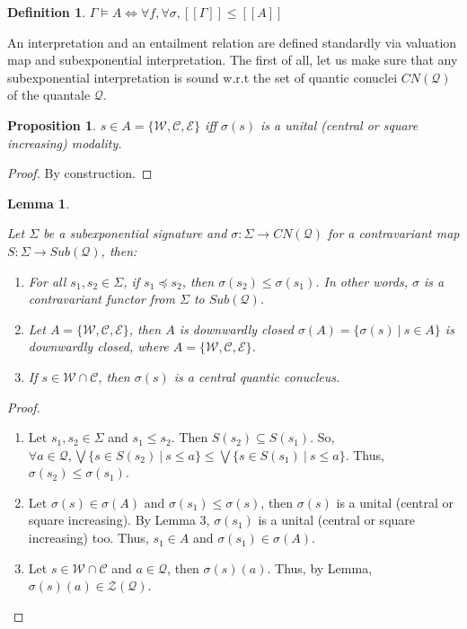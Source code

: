 \documentclass[a4paper]{article}
\theoremstyle{defin}
\newtheorem{defin}{Definition}
\theoremstyle{theorem}
\theoremstyle{prop}
\newtheorem{prop}{Proposition}
\theoremstyle{lemma}
\newtheorem{lemma}{Lemma}
\theoremstyle{ex}
\theoremstyle{col}
\begin{document}
\begin{defin}
  $\Gamma \models A \Leftrightarrow \forall f, \forall \sigma, [\![\Gamma]\!] \leq [\![A]\!]$
\end{defin}

An interpretation and an entailment relation are defined standardly via valuation map and subexponential interpretation.
The first of all, let us make sure that any subexponential interpretation is sound w.r.t the set of quantic conuclei $CN(\mathcal{Q})$ of the quantale $\mathcal{Q}$.

\begin{prop} $s \in A = \{ \mathcal{W}, \mathcal{C}, \mathcal{E} \}$ iff $\sigma(s)$ is a unital (central or square increasing) modality.
\end{prop}

\begin{proof}
  By construction.
\end{proof}

\begin{lemma}
  $ $

  Let $\Sigma$ be a subexponential signature and $\sigma : \Sigma \to CN(\mathcal{Q})$ for a contravariant map
  $S : \Sigma \to Sub(\mathcal{Q})$, then:
  \begin{enumerate}
  \item For all $s_1, s_2 \in \Sigma$, if $s_1 \preceq s_2$, then $\sigma(s_2) \leq \sigma(s_1)$.
  In other words, $\sigma$ is a contravariant functor from $\Sigma$ to $Sub(\mathcal{Q})$.
  \item Let $A = \{ \mathcal{W}, \mathcal{C}, \mathcal{E} \}$, then $A$ is downwardly closed
  $\sigma(A) = \{ \sigma(s) \: | \: s \in A \}$ is downwardly closed, where $A = \{ \mathcal{W}, \mathcal{C}, \mathcal{E} \}$.
  \item If $s \in \mathcal{W} \cap \mathcal{C}$, then $\sigma(s)$ is a central quantic conucleus.
\end{enumerate}
\end{lemma}

\begin{proof}
  $ $

  \begin{enumerate}
  \item Let $s_1, s_2 \in \Sigma$ and $s_1 \leq s_2$. Then $S(s_2) \subseteq S(s_1)$.
  So, $\forall a \in \mathcal{Q}, \bigvee \{ s \in S(s_2) \: | \: s \leq a \} \leq \bigvee \{ s \in S(s_1) \: | \: s \leq a \}$. Thus, $\sigma(s_2) \leq \sigma(s_1)$.
  \item Let $\sigma(s) \in \sigma(A)$ and $\sigma(s_1) \leq \sigma(s)$, then $\sigma(s)$ is a unital (central or square increasing). By Lemma 3, $\sigma(s_1)$ is a unital (central or square increasing) too. Thus, $s_1 \in A$ and $\sigma(s_1) \in \sigma(A)$.
  \item Let $s \in \mathcal{W} \cap \mathcal{C}$ and $a \in \mathcal{Q}$,
  then $\sigma(s)(a)$. Thus, by Lemma, $\sigma(s)(a) \in \mathcal{Z}(\mathcal{Q})$.

\end{enumerate}
\end{proof}
\end{document}
